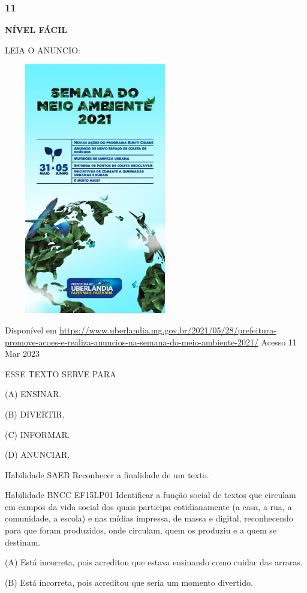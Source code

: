 \subsubsection{11}\label{section-104}

\textbf{NÍVEL FÁCIL}

LEIA O ANUNCIO:

\includegraphics[width=3.12674in,height=4.31210in]{media/image145.jpeg}

Disponível em
\url{https://www.uberlandia.mg.gov.br/2021/05/28/prefeitura-promove-acoes-e-realiza-anuncios-na-semana-do-meio-ambiente-2021/}
Acesso 11 Mar 2023

ESSE TEXTO SERVE PARA

(A) ENSINAR.

(B) DIVERTIR.

(C) INFORMAR.

(D) ANUNCIAR.

Habilidade SAEB Reconhecer a finalidade de um texto.

Habilidade BNCC EF15LP01 Identificar a função social de textos que
circulam em campos da vida social dos quais participa cotidianamente (a
casa, a rua, a comunidade, a escola) e nas mídias impressa, de massa e
digital, reconhecendo para que foram produzidos, onde circulam, quem os
produziu e a quem se destinam.

(A) Está incorreta, pois acreditou que estava ensinando como cuidar das
arraras.

(B) Está incorreta, pois acreditou que seria um momento divertido.

